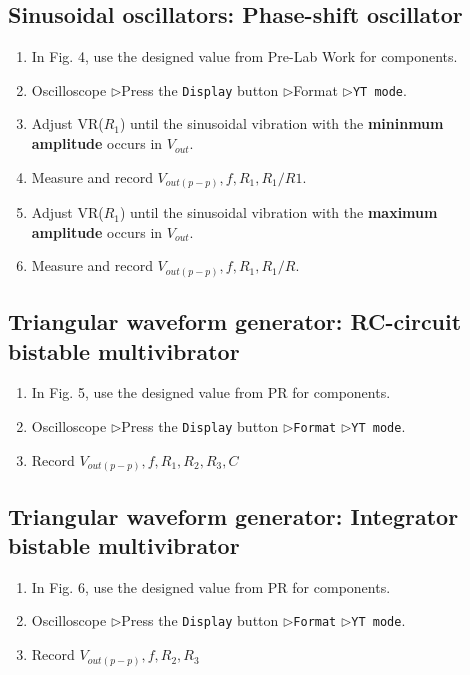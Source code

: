 \documentclass[12pt, a4paper]{article}
\newcommand{\tri}{$\rhd$}
\begin{document}
\subsection{Sinusoidal oscillators: Phase-shift oscillator}
\begin{enumerate}[itemsep=0pt]
  \item In Fig. 4, use the designed value from Pre-Lab Work for components.
  \item Oscilloscope \tri Press the \texttt{Display} button \tri Format \tri \texttt{YT mode}.

  \item Adjust VR($R_1$) until the sinusoidal vibration with the
    {\bf mininmum amplitude} occurs in $V_{out}$.
  \item Measure and record $V_{out(p-p)}, f, R_1, R_1/R1$.
  \item Adjust VR($R_1$) until the sinusoidal vibration with the
    {\bf maximum amplitude} occurs in $V_{out}$.
  \item Measure and record $V_{out(p-p)}, f, R_1, R_1/R$.

\end{enumerate}

\subsection{Triangular waveform generator: RC-circuit bistable multivibrator}
\begin{enumerate}[itemsep=0pt]
  \item In Fig. 5, use the designed value from PR for components.
  \item Oscilloscope \tri Press the \texttt{Display} button \tri \texttt{Format} 
    \tri \texttt{YT mode}.
  \item Record $V_{out(p-p)}, f, R_1, R_2, R_3, C$
\end{enumerate}

\subsection{Triangular waveform generator: Integrator bistable multivibrator}
\begin{enumerate}[itemsep=0pt]
  \item In Fig. 6, use the designed value from PR for components.
  \item Oscilloscope \tri Press the \texttt{Display} button \tri \texttt{Format} 
    \tri \texttt{YT mode}.
  \item Record $V_{out(p-p)}, f, R_2, R_3$
\end{enumerate}
\end{document}
